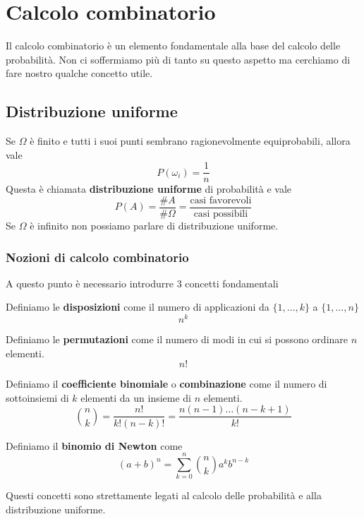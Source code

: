\chapter{Calcolo combinatorio}
Il calcolo combinatorio è un elemento fondamentale alla base del calcolo delle probabilità. Non ci
soffermiamo più di tanto su questo aspetto ma cerchiamo di fare nostro qualche concetto utile.

\section{Distribuzione uniforme}
Se $\Omega$ è finito e tutti i suoi punti sembrano ragionevolmente equiprobabili, allora vale
\[ P(\omega_i) = \frac{1}{n} \]
Questa è chiamata \textbf{distribuzione uniforme} di probabilità e vale
\[ P(A) = \frac{\# A}{\# \Omega} = \frac{\text{casi favorevoli}}{\text{casi possibili}} \]
Se $\Omega$ è infinito non possiamo parlare di distribuzione uniforme.

\subsection{Nozioni di calcolo combinatorio}
A questo punto è necessario introdurre 3 concetti fondamentali
\begin{definition}
	Definiamo le \textbf{disposizioni} come il numero di applicazioni da $\{ 1, \dots, k \}$ a
	$\{ 1, \dots, n \}$
	\[ n^k \]
\end{definition}

\begin{definition}
	Definiamo le \textbf{permutazioni} come il numero di modi in cui si possono ordinare $n$ elementi.
	\[ n! \]
\end{definition}

\begin{definition}
	Definiamo il \textbf{coefficiente binomiale} o \textbf{combinazione} come il numero di sottoinsiemi
	di $k$ elementi da un insieme di $n$ elementi.
	\[ \binom{n}{k} = \frac{n!}{k! (n-k)!} = \frac{n (n-1) \dots (n-k+1)}{k!} \]
\end{definition}

\begin{definition}
	Definiamo il \textbf{binomio di Newton} come
	\[ (a + b)^n = \sum_{k=0}^n \binom{n}{k} a^k b^{n-k} \]
\end{definition}

Questi concetti sono strettamente legati al calcolo delle probabilità e alla distribuzione uniforme.